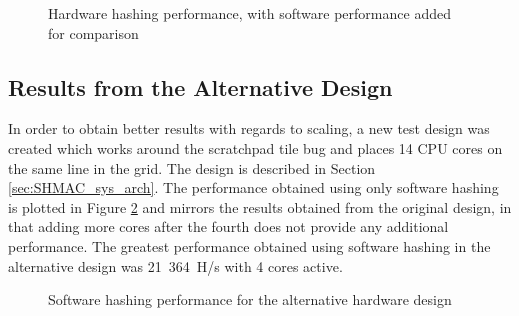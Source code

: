 \begin{figure}
	\centering
	\caption{Hardware hashing performance, with software performance added for comparison}
	\label{fig:shadmacomp-scaling1}
\end{figure}

\subsection{Results from the Alternative Design}
In order to obtain better results with regards to scaling, a new test design was created which works
around the scratchpad tile bug and places 14 CPU cores on the same line in the grid. The design
is described in Section \ref{sec:SHMAC_sys_arch}. The performance obtained using only software hashing
is plotted in Figure \ref{fig:sw-scaling2} and mirrors the results obtained from the original design,
in that adding more cores after the fourth does not provide any additional performance. The greatest
performance obtained using software hashing in the alternative design was 21~364~H/s with 4 cores
active.

\begin{figure}
	\centering
	\caption{Software hashing performance for the alternative hardware design}
	\label{fig:sw-scaling2}
\end{figure}

